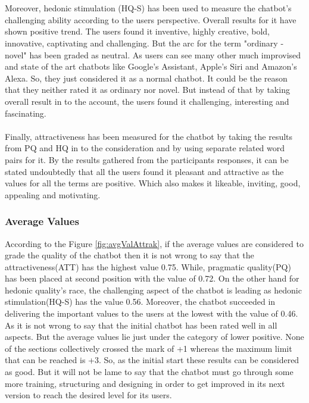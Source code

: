 \\~\\
Moreover, hedonic stimulation (HQ-S) has been used to measure the chatbot's challenging ability according to the users perspective. Overall results for it have shown positive trend. The users found it inventive, highly creative, bold, innovative, captivating and challenging. But the arc for the term "ordinary - novel" has been graded as neutral. As users can see many other much improvised and state of the art chatbots like Google's Assistant, Apple's Siri and Amazon's Alexa. So, they just considered it as a normal chatbot. It could be the reason that they neither rated it as ordinary nor novel. But instead of that by taking overall result in to the account, the users found it challenging, interesting and fascinating.
\\~\\
Finally, attractiveness has been measured for the chatbot by taking the results from PQ and HQ in to the consideration and by using separate related word pairs for it. By the results gathered from the participants responses, it can be stated undoubtedly that all the users found it pleasant and attractive as the values for all the terms are positive. Which also makes it likeable, inviting, good, appealing and motivating.

\subsubsection*{Average Values}
According to the Figure \ref{fig:avgValAttrak}, if the average values are considered to grade the quality of the chatbot then it is not wrong to say that the attractiveness(ATT) has the highest value 0.75. While, pragmatic quality(PQ) has been placed at second position with the value of 0.72. On the other hand for hedonic quality's race, the challenging aspect of the chatbot is leading as hedonic stimulation(HQ-S) has the value 0.56. Moreover, the chatbot succeeded in delivering the important values to the users at the lowest with the value of 0.46. As it is not wrong to say that the initial chatbot has been rated well in all aspects. But the average values lie just under the category of lower positive. None of the sections collectively crossed the mark of +1 whereas the maximum limit that can be reached is +3. So, as the initial start these results can be considered as good. But it will not be lame to say that the chatbot must go through some more training, structuring and designing in order to get improved in its next version to reach the desired level for its users.

